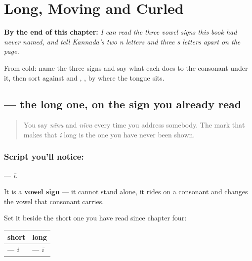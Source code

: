 
\chapter{Long, Moving and Curled}
\label{ch:ka-chihnegaLu}

\begin{chapteropening}
\textbf{By the end of this chapter:} \emph{I can read the three vowel signs this book had never named, and tell Kannada's two n letters and three s letters apart on the page.}

From cold: name the three signs and say what each does to the consonant under it, then sort  against  and , ,  by where the tongue sits.
\end{chapteropening}

\section[\texorpdfstring{\kn{◌ೀ} (ī)}{◌ೀ (ī)}]{ — the long one, on the sign you already read}

\label{lesson:KA-S161-vowel-sign-ii}



\begin{quote}
You say \emph{nīnu} and \emph{nīvu} every time you address somebody. The mark that makes that \emph{i} long is the one you have never been shown.
\end{quote}

\subsection*{Script you'll notice: }
\textbf{} — \emph{ī}.

It is a \textbf{vowel sign} — it cannot stand alone, it rides on a consonant and changes the vowel that consonant carries.

Set it beside the short one you have read since chapter four:

\noindent
\begin{tabularx}{\linewidth}{@{}>{\raggedright\arraybackslash}X>{\raggedright\arraybackslash}X@{}}
\toprule
\textbf{short} & \textbf{long} \\
\midrule
\kn{ಿ} — \emph{i} & \kn{ೀ} — \emph{ī} \\
\bottomrule
\end{tabularx}

